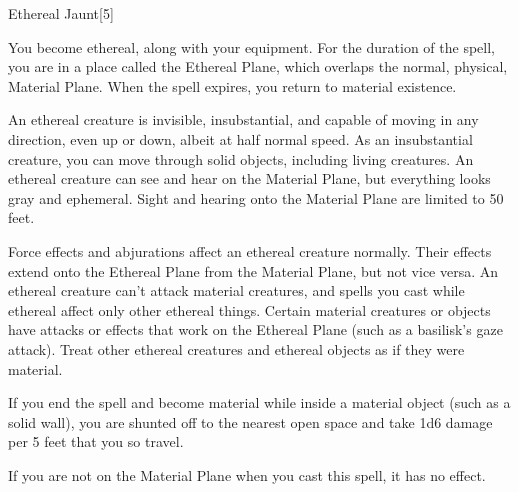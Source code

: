 \begin{spellsection}{Ethereal Jaunt}[5]
    \begin{spellheader}
    \end{spellheader}
    \begin{spellcontent}
        \begin{spelltargetinginfo}
        \end{spelltargetinginfo}
        \begin{spelleffects}
            \spelleffect You become ethereal, along with your equipment. For the duration of the spell, you are in a place called the Ethereal Plane, which overlaps the normal, physical, Material Plane. When the spell expires, you return to material existence.
            \par An ethereal creature is invisible, insubstantial, and capable of moving in any direction, even up or down, albeit at half normal speed. As an insubstantial creature, you can move through solid objects, including living creatures. An ethereal creature can see and hear on the Material Plane, but everything looks gray and ephemeral. Sight and hearing onto the Material Plane are limited to 50 feet.
            \par Force effects and abjurations affect an ethereal creature normally. Their effects extend onto the Ethereal Plane from the Material Plane, but not vice versa. An ethereal creature can't attack material creatures, and spells you cast while ethereal affect only other ethereal things. Certain material creatures or objects have attacks or effects that work on the Ethereal Plane (such as a basilisk's gaze attack). Treat other ethereal creatures and ethereal objects as if they were material.
            \par If you end the spell and become material while inside a material object (such as a solid wall), you are shunted off to the nearest open space and take 1d6 damage per 5 feet that you so travel.
            \spelldur \durshort \dismissable
        \end{spelleffects}
    \end{spellcontent}
    \begin{spellfooter}
        \spellnotes If you are not on the Material Plane when you cast this spell, it has no effect.
        \miscastexplode
    \end{spellfooter}
\end{spellsection}

